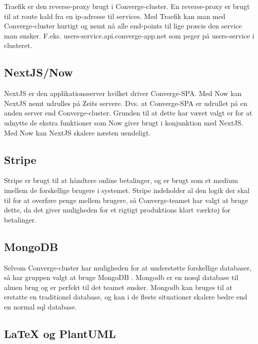 Traefik \cite[Traefik]{converge-terms} er den reverse-proxy \cite[Reverse-Proxy]{converge-terms} brugt i Converge-cluster. En reverse-proxy er brugt til at route kald fra en ip-adresse til services. Med Traefik kan man med Converge-cluster hurtigt og nemt nå alle end-points til lige præcis den service man ønsker. F.eks. users-service.api.converge-app.net som peger på users-service i clusteret.

\subsection{NextJS/Now}

NextJS \cite[NextJS]{converge-terms} er den applikationsserver \cite[Applikationsserver]{converge-terms} hvilket driver Converge-SPA. Med Now \cite[Now]{converge-terms} kan NextJS nemt udrulles på Zeits servere. Dvs. at Converge-SPA er udrullet på en anden server end Converge-cluster. Grunden til at dette har været valgt er for at udnytte de ekstra funktioner som Now giver brugt i konjunktion med NextJS. Med Now kan NextJS skalere næsten uendeligt.

\subsection{Stripe}

Stripe \cite[Stripe]{converge-terms} er brugt til at håndtere online betalinger, og er brugt som et medium imellem de forskellige brugere i systemet. Stripe indeholder al den logik der skal til for at overføre penge mellem brugere, så Converge-teamet har valgt at bruge dette, da det giver muligheden for et rigtigt produktions klart værktøj for betalinger.

\subsection{MongoDB}

Selvom Converge-cluster har muligheden for at understøtte forskellige databaser, så har gruppen valgt at bruge MongoDB \cite[MongoDB]{converge-terms}. Mongodb er en nosql \cite[nosql]{converge-terms} database til almen brug og er perfekt til det teamet ønsker. Mongodb kan bruges til at erstatte en traditionel database, og kan i de fleste situationer skalere bedre end en normal sql database.

\subsection{LaTeX og PlantUML}

